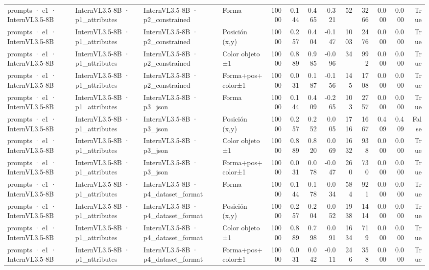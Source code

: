 \begin{tabular}{llllrrrrrrrrr}
prompts · e1 · InternVL3.5-8B & InternVL3.5-8B · p1\_attributes & InternVL3.5-8B · p2\_constrained & Forma & 10000 & 0.144 & 0.465 & -0.321 & 52 & 3266 & 0.000 & 0.000 & True \\
prompts · e1 · InternVL3.5-8B & InternVL3.5-8B · p1\_attributes & InternVL3.5-8B · p2\_constrained & Posición (x,y) & 10000 & 0.257 & 0.404 & -0.147 & 1003 & 2476 & 0.000 & 0.000 & True \\
prompts · e1 · InternVL3.5-8B & InternVL3.5-8B · p1\_attributes & InternVL3.5-8B · p2\_constrained & Color objeto ±1 & 10000 & 0.889 & 0.985 & -0.096 & 34 & 992 & 0.000 & 0.000 & True \\
prompts · e1 · InternVL3.5-8B & InternVL3.5-8B · p1\_attributes & InternVL3.5-8B · p2\_constrained & Forma+pos+color±1 & 10000 & 0.031 & 0.187 & -0.156 & 145 & 1708 & 0.000 & 0.000 & True \\
prompts · e1 · InternVL3.5-8B & InternVL3.5-8B · p1\_attributes & InternVL3.5-8B · p3\_json & Forma & 10000 & 0.144 & 0.409 & -0.265 & 103 & 2757 & 0.000 & 0.000 & True \\
prompts · e1 · InternVL3.5-8B & InternVL3.5-8B · p1\_attributes & InternVL3.5-8B · p3\_json & Posición (x,y) & 10000 & 0.257 & 0.252 & 0.005 & 1716 & 1667 & 0.409 & 0.409 & False \\
prompts · e1 · InternVL3.5-8B & InternVL3.5-8B · p1\_attributes & InternVL3.5-8B · p3\_json & Color objeto ±1 & 10000 & 0.889 & 0.820 & 0.069 & 1632 & 938 & 0.000 & 0.000 & True \\
prompts · e1 · InternVL3.5-8B & InternVL3.5-8B · p1\_attributes & InternVL3.5-8B · p3\_json & Forma+pos+color±1 & 10000 & 0.031 & 0.078 & -0.047 & 260 & 730 & 0.000 & 0.000 & True \\
prompts · e1 · InternVL3.5-8B & InternVL3.5-8B · p1\_attributes & InternVL3.5-8B · p4\_dataset\_format & Forma & 10000 & 0.144 & 0.178 & -0.034 & 584 & 921 & 0.000 & 0.000 & True \\
prompts · e1 · InternVL3.5-8B & InternVL3.5-8B · p1\_attributes & InternVL3.5-8B · p4\_dataset\_format & Posición (x,y) & 10000 & 0.257 & 0.204 & 0.052 & 1938 & 1414 & 0.000 & 0.000 & True \\
prompts · e1 · InternVL3.5-8B & InternVL3.5-8B · p1\_attributes & InternVL3.5-8B · p4\_dataset\_format & Color objeto ±1 & 10000 & 0.889 & 0.798 & 0.091 & 1634 & 719 & 0.000 & 0.000 & True \\
prompts · e1 · InternVL3.5-8B & InternVL3.5-8B · p1\_attributes & InternVL3.5-8B · p4\_dataset\_format & Forma+pos+color±1 & 10000 & 0.031 & 0.042 & -0.011 & 246 & 358 & 0.000 & 0.000 & True \\

\end{tabular}
